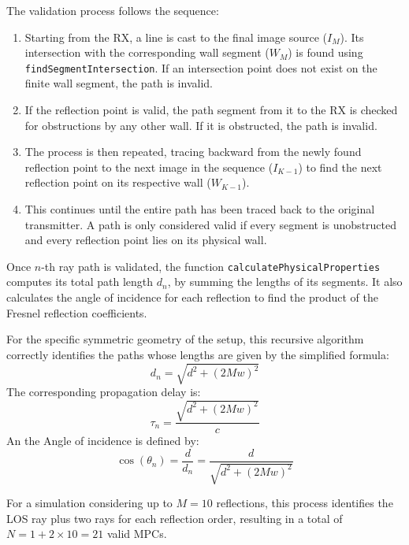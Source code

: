 The validation process follows the sequence:
\begin{enumerate}
	\item Starting from the RX, a line is cast to the final image source ($I_M$). Its intersection with the corresponding wall segment ($W_M$) is found using \texttt{findSegmentIntersection}. If an intersection point does not exist on the finite wall segment, the path is invalid.
	\item If the reflection point is valid, the path segment from it to the RX is checked for obstructions by any other wall. If it is obstructed, the path is invalid.
	\item The process is then repeated, tracing backward from the newly found reflection point to the next image in the sequence ($I_{K-1}$) to find the next reflection point on its respective wall ($W_{K-1}$).
	\item This continues until the entire path has been traced back to the original transmitter. A path is only considered valid if every segment is unobstructed and every reflection point lies on its physical wall.
\end{enumerate}

Once $n$-th ray path is validated, the function \texttt{calculatePhysicalProperties} computes its total path length $d_n$, by summing the lengths of its segments. It also calculates the angle of incidence for each reflection to find the product of the Fresnel reflection coefficients.

For the specific symmetric  geometry of the setup, this recursive algorithm correctly identifies the paths whose lengths are given by the simplified formula:
\begin{equation}
	d_{n} = \sqrt{d^2 + (2Mw)^2}
\end{equation}
The corresponding propagation delay is:
\begin{equation}
	\tau_{n} = \frac{\sqrt{d^2 + (2Mw)^2}}{c}
\end{equation}
An the Angle of incidence is defined by:
\begin{equation}
	\cos(\theta_{n}) = \frac{d}{d_{n}} = \frac{d}{\sqrt{d^2 + (2Mw)^2}}
\end{equation}

For a simulation considering up to $M=10$ reflections, this process identifies the LOS ray plus two rays for each reflection order, resulting in a total of $N=1+2\times10=21$ valid MPCs.

